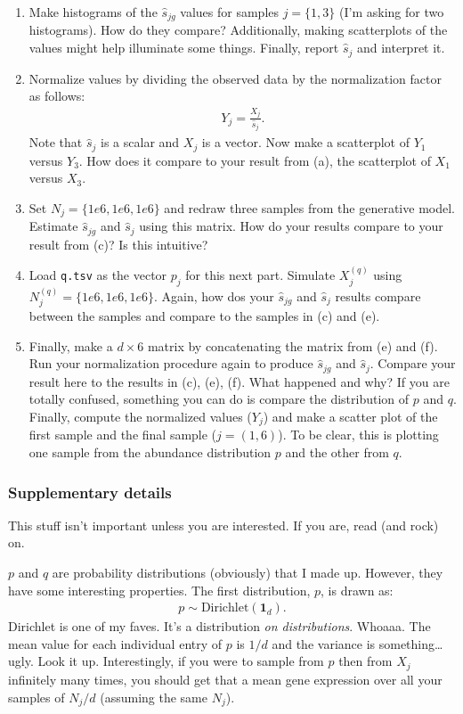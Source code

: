 \begin{enumerate}[label=(\alph*)]
  \item Make histograms of the $\hat{s}_{jg}$ values for samples $j = \{1, 3\}$ (I'm asking for two histograms). How do they compare? Additionally, making scatterplots of the values might help illuminate some things.
    Finally, report $\hat{s}_j$ and interpret it.
  \item Normalize values by dividing the observed data by the normalization factor as follows:
    \begin{align*}
      Y_j = \frac{X_j}{\hat{s}_j}.
    \end{align*}
    Note that $\hat{s}_j$ is a scalar and $X_j$ is a vector.
    Now make a scatterplot of $Y_1$ versus $Y_3$.
    How does it compare to your result from (a), the scatterplot of $X_1$ versus $X_3$.
  \item Set $N_j = \{1e6, 1e6, 1e6\}$ and redraw three samples from the generative model.
    Estimate $\hat{s}_{jg}$ and $\hat{s}_j$ using this matrix.
    How do your results compare to your result from (c)? Is this intuitive?
  \item Load \texttt{q.tsv} as the vector $p_j$ for this next part.
    Simulate $X_j^{(q)}$ using $N_j^{(q)} = \{1e6, 1e6, 1e6\}$.
    Again, how dos your $\hat{s}_{jg}$ and $\hat{s}_j$ results compare between the samples and compare to the samples in (c) and (e).
  \item Finally, make a $d \times 6$ matrix by concatenating the matrix from (e) and (f).
    Run your normalization procedure again to produce $\hat{s}_{jg}$ and $\hat{s}_j$.
    Compare your result here to the results in (c), (e), (f).
    What happened and why?
    If you are totally confused, something you can do is compare the distribution of $p$ and $q$.
    Finally, compute the normalized values ($Y_j$) and make a scatter plot of the first sample and the final sample ($j = (1, 6)$).
    To be clear, this is plotting one sample from the abundance distribution $p$ and the other from $q$.
\end{enumerate}

\subsubsection*{Supplementary details}

This stuff isn't important unless you are interested. If you are, read (and rock) on.

$p$ and $q$ are probability distributions (obviously) that I made up.
However, they have some interesting properties.
The first distribution, $p$, is drawn as:
\begin{align*}
  p \sim \text{Dirichlet}\left(\mathbf{1}_d\right).
\end{align*}
Dirichlet is one of my faves.
It's a distribution \textit{on distributions}.
Whoaaa.
The mean value for each individual entry of $p$ is $1 / d$ and the variance is something\ldots ugly.
Look it up.
Interestingly, if you were to sample from $p$ then from $X_j$ infinitely many times, you should get that a mean gene expression over all your samples of $N_j / d$ (assuming the same $N_j$).

